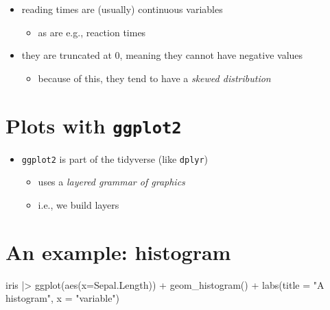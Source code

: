 \documentclass[
  letterpaper,
  DIV=11,
  numbers=noendperiod]{scrartcl}
\newenvironment{Shaded}{\begin{snugshade}}{\end{snugshade}}
\newcommand{\AttributeTok}[1]{\textcolor[rgb]{0.40,0.45,0.13}{#1}}
\newcommand{\FunctionTok}[1]{\textcolor[rgb]{0.28,0.35,0.67}{#1}}
\newcommand{\NormalTok}[1]{\textcolor[rgb]{0.00,0.23,0.31}{#1}}
\newcommand{\SpecialCharTok}[1]{\textcolor[rgb]{0.37,0.37,0.37}{#1}}
\newcommand{\StringTok}[1]{\textcolor[rgb]{0.13,0.47,0.30}{#1}}
\providecommand{\tightlist}{%
  \setlength{\itemsep}{0pt}\setlength{\parskip}{0pt}}\usepackage{longtable,booktabs,array}
\begin{document}
\begin{itemize}
\tightlist
\item
  reading times are (usually) continuous variables

  \begin{itemize}
  \tightlist
  \item
    as are e.g., reaction times
  \end{itemize}
\item
  they are truncated at 0, meaning they cannot have negative values

  \begin{itemize}
  \tightlist
  \item
    because of this, they tend to have a \emph{skewed distribution}
  \end{itemize}
\end{itemize}

\hypertarget{plots-with-ggplot2}{%
\section{\texorpdfstring{Plots with
\texttt{ggplot2}}{Plots with ggplot2}}\label{plots-with-ggplot2}}

\begin{itemize}
\tightlist
\item
  \texttt{ggplot2} is part of the tidyverse (like \texttt{dplyr})

  \begin{itemize}
  \tightlist
  \item
    uses a \emph{layered grammar of graphics}
  \item
    i.e., we build layers
  \end{itemize}
\end{itemize}

\hypertarget{an-example-histogram}{%
\section{An example: histogram}\label{an-example-histogram}}

\begin{Shaded}
\begin{Highlighting}[]
\NormalTok{iris }\SpecialCharTok{|\textgreater{}} 
  \FunctionTok{ggplot}\NormalTok{(}\FunctionTok{aes}\NormalTok{(}\AttributeTok{x=}\NormalTok{Sepal.Length)) }\SpecialCharTok{+}
  \FunctionTok{geom\_histogram}\NormalTok{() }\SpecialCharTok{+}
  \FunctionTok{labs}\NormalTok{(}\AttributeTok{title =} \StringTok{"A histogram"}\NormalTok{,}
       \AttributeTok{x =} \StringTok{"variable"}\NormalTok{)}
\end{Highlighting}
\end{Shaded}
\end{document}
